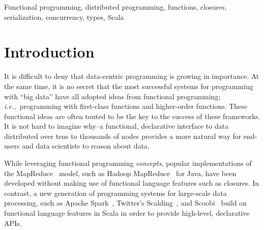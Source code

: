 \documentclass[preprint]{sigplanconf}
\theoremstyle{definition}
\theoremstyle{definition}
\newcommand{\ie}{{\em i.e.,~}}
\begin{document}
\begin{abstract}


\end{abstract}


\keywords
Functional programming, distributed programming, functions, closures,
serialization, concurrency, types, Scala

\section{Introduction}

It is difficult to deny that data-centric programming is growing in importance.
At the same time, it is no secret that the most successful systems for
programming with ``big data'' have all adopted ideas from functional
programming; \ie programming with first-class functions and higher-order
functions. These functional ideas are often touted to be the key to the
success of these frameworks. It is not hard to imagine why--a functional,
declarative interface to data distributed over tens to thousands of nodes
provides a more natural way for end-users and data scientists to reason about
data.

While leveraging functional programming {\em concepts}, popular
implementations of the MapReduce~\cite{MapReduce} model, such as Hadoop
MapReduce~\cite{Hadoop} for Java, have been developed without making use of
functional language features such as closures. In contrast, a new generation
of programming systems for large-scale data processing, such as Apache
Spark~\cite{Spark}, Twitter's Scalding~\cite{Scalding}, and
Scoobi~\cite{Scoobi} build on functional language features in Scala in order
to provide high-level, declarative APIs.
\end{document}
